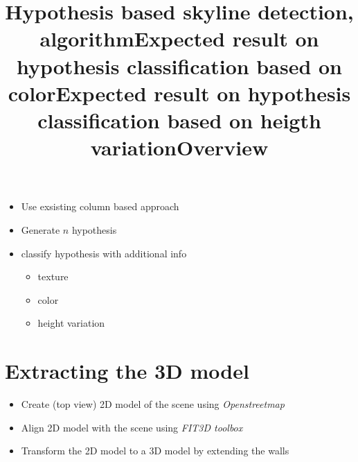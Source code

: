 \title{Hypothesis based skyline detection, algorithm}
\begin{itemize}
\item Use exsisting column based approach
\item Generate $n$ hypothesis
\item classify hypothesis with additional info
	\begin{itemize}
	\item texture 
	\item color
	\item height variation 
	\end{itemize}
\end{itemize}

\title{Expected result on hypothesis classification based on color}

\title{Expected result on hypothesis classification based on heigth variation}



%


\section{Extracting the 3D model}
\title{Overview}
\begin{itemize}
\item Create (top view) 2D model of the scene using \emph{Openstreetmap}
\item Align 2D model with the scene using \emph{FIT3D toolbox}
\item Transform the 2D model to a 3D model by extending the walls
\end{itemize}





